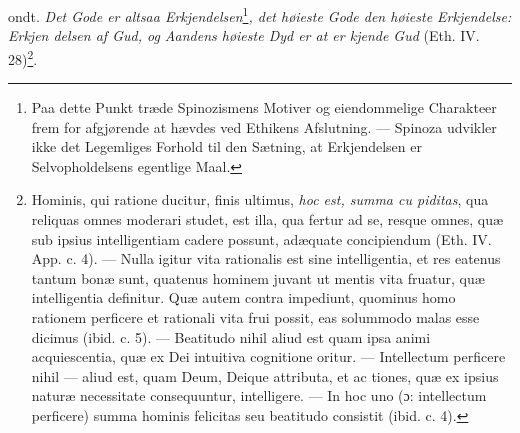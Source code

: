 \documentclass[12pt,a4paper]{book}
\begin{document}
ondt. \emph{Det Gode er altsaa Erkjendelsen}\footnote{Paa dette Punkt træde Spinozismens Motiver og eiendommelige
Charakteer frem for afgjørende at hævdes ved Ethikens Afslutning. --- Spinoza udvikler ikke det Legemliges Forhold til den Sætning,
at Erkjendelsen er Selvopholdelsens egentlige Maal.}\emph{, det
høieste Gode den høieste Erkjendelse: Erkjen\-%
delsen af Gud, og Aandens høieste Dyd er at er\-%
kjende Gud} (Eth. IV. 28)\footnote{Hominis, qui ratione ducitur, finis ultimus, \emph{hoc est, summa cu\-%
piditas}, qua reliquas omnes moderari studet, est illa, qua fertur
ad se, resque omnes, quæ sub ipsius intelligentiam cadere possunt,
adæquate concipiendum (Eth. IV. App. c. 4). --- Nulla igitur vita
rationalis est sine intelligentia, et res eatenus tantum bonæ sunt,
quatenus hominem juvant ut mentis vita fruatur, quæ intelligentia
definitur. Quæ autem contra impediunt, quominus homo rationem
perficere et rationali vita frui possit, eas solummodo malas esse
dicimus (ibid. c. 5). --- Beatitudo nihil aliud est quam ipsa animi
acquiescentia, quæ ex Dei intuitiva cognitione oritur. --- Intellectum
perficere nihil --- aliud est, quam Deum, Deique attributa, et ac\-%
tiones, quæ ex ipsius naturæ necessitate consequuntur, intelligere. --- In hoc uno (ɔ: intellectum perficere) summa hominis felicitas
seu beatitudo consistit (ibid. c. 4).}.
\end{document}
